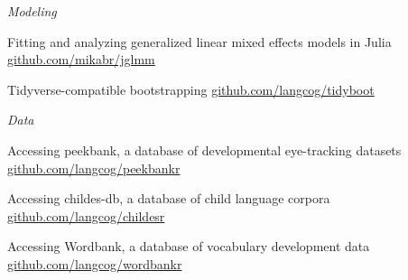 \documentclass[11pt,]{article}
\newcommand{\plab}[1]{
  \footnotesize \texttt{#1} \normalsize
}
\newcommand{\hlink}[1]{
  \hfill \small \href{http://#1}{#1} \normalsize
}
\begin{document}
\vspace{8pt}

\emph{Modeling}

\begin{description}[leftmargin=!,labelwidth=\widthof{\plab{tidyboot}}]
  \item[\plab{jglmm}] Fitting and analyzing generalized linear mixed effects models in Julia \hlink{github.com/mikabr/jglmm}
  \item[\plab{tidyboot}] Tidyverse-compatible bootstrapping \hlink{github.com/langcog/tidyboot}
\end{description}

\vspace{8pt}

\emph{Data}

\begin{description}[leftmargin=!,labelwidth=\widthof{\plab{wordbankr}}]
  \item[\plab{peekbankr}] Accessing peekbank, a database of developmental eye-tracking datasets \hlink{github.com/langcog/peekbankr}
  \item[\plab{childesr}] Accessing childes-db, a database of child language corpora \hlink{github.com/langcog/childesr}
  \item[\plab{wordbankr}] Accessing Wordbank, a database of vocabulary development data \hlink{github.com/langcog/wordbankr}
\end{description}
\end{document}
